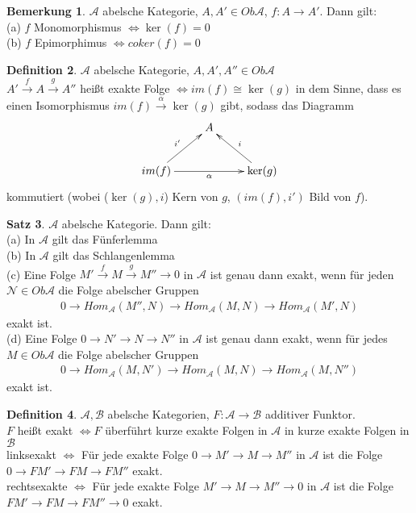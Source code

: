 \documentclass[10pt,a4paper,numbers=endperiod]{scrreprt}
\theoremstyle{definition}
\newtheorem{satz}{Satz}[section]
\newtheorem{defi}[satz]{Definition}
\newtheorem{bem}[satz]{Bemerkung}
\begin{document}
\begin{bem}
	$\mathcal{A}$ abelsche Kategorie, $A, A' \in Ob \mathcal{A}$, $f: A \to A'$. Dann gilt:\\
	(a) $f$ Monomorphismus $\Leftrightarrow \ker(f) = 0$\\
	(b) $f$ Epimorphimus $\Leftrightarrow coker(f) = 0$
\end{bem}

\begin{defi}
	$\mathcal{A}$ abelsche Kategorie, $A, A', A'' \in Ob \mathcal{A}$\\
	$A' \overset{f}{\longrightarrow} A \overset{g}{\longrightarrow} A''$ heißt exakte Folge $\Leftrightarrow im(f) \cong \ker(g)$ in dem Sinne, dass es einen Isomorphismus $im(f) \overset{\alpha}{\longrightarrow} \ker(g)$ gibt, sodass das Diagramm \begin{align*}
	\begin{xy} 
		\xymatrix{
		& A &\\
		im(f) \ar[ur]^{i'} \ar[rr]_\alpha & & \ker(g) \ar[ul]_i 
	 }
 	\end{xy}
	\end{align*}
	kommutiert (wobei ($\ker(g), i$) Kern von $g$, $(im(f), i')$ Bild von $f$).
\end{defi}

\begin{satz}
	$\mathcal{A}$ abelsche Kategorie. Dann gilt:\\
	(a) In $\mathcal{A}$ gilt das Fünferlemma\\
	(b) In $\mathcal{A}$ gilt das Schlangenlemma\\
	(c) Eine Folge $M' \overset{f}{\to} M \overset{g}{\to} M'' \to 0$ in $\mathcal{A}$ ist genau dann exakt, wenn für jeden $\mathcal{N} \in Ob \mathcal{A}$ die Folge abelscher Gruppen \begin{align*}
		0 \to Hom_\mathcal{A}(M'', N) \to Hom_\mathcal{A}(M, N) \to Hom_\mathcal{A}(M', N)
	\end{align*}
	exakt ist.\\
	(d) Eine Folge $0 \to N' \to N \to N''$ in $\mathcal{A}$ ist genau dann exakt, wenn für jedes $M \in Ob \mathcal{A}$ die Folge abelscher Gruppen \begin{align*}
		0 \to Hom_\mathcal{A} (M, N') \to Hom_\mathcal{A}(M, N) \to Hom_\mathcal{A}(M, N'')
	\end{align*}
	exakt ist.
\end{satz}

\begin{defi}
	$\mathcal{A}, \mathcal{B}$ abelsche Kategorien, $F: \mathcal{A} \to \mathcal{B}$ additiver Funktor.\\
	$F$ heißt exakt $\Leftrightarrow F$ überführt kurze exakte Folgen in $\mathcal{A}$ in kurze exakte Folgen in $\mathcal{B}$\\
	linksexakt $\Leftrightarrow$ Für jede exakte Folge $0 \to M' \to M \to M''$ in $\mathcal{A}$ ist die Folge $0 \to FM' \to FM \to FM''$ exakt.\\
	rechtsexakte $\Leftrightarrow$ Für jede exakte Folge $M' \to M \to M'' \to 0$ in $\mathcal{A}$ ist die Folge $FM' \to FM \to FM'' \to 0$ exakt.
\end{defi}
\end{document}
